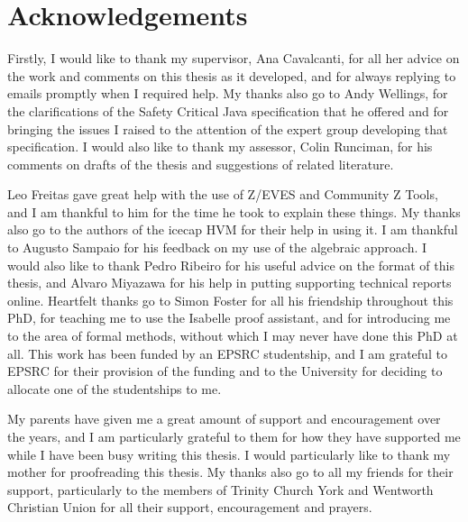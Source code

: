 \documentclass[a4paper,11pt,twoside,openright]{report}
\begin{document}
\cleardoublepage
{}
{}
\tableofcontents

\cleardoublepage
{}
{}
\listoftables

\cleardoublepage
{}
{}
\listoffigures

\cleardoublepage
{}
{}
\chapter*{Acknowledgements}

Firstly, I would like to thank my supervisor, Ana Cavalcanti, for all
her advice on the work and comments on this thesis as it developed,
and for always replying to emails promptly when I required help.
My thanks also go to Andy Wellings, for the clarifications of the
Safety Critical Java specification that he offered and for bringing
the issues I raised to the attention of the expert group developing
that specification.
I would also like to thank my assessor, Colin Runciman, for his
comments on drafts of the thesis and suggestions of related
literature.

Leo Freitas gave great help with the use of Z/EVES and Community Z
Tools, and I am thankful to him for the time he took to explain these
things.
My thanks also go to the authors of the icecap HVM for their help in
using it.
I am thankful to Augusto Sampaio for his feedback on my use of
the algebraic approach.
I would also like to thank Pedro Ribeiro for his useful advice on the
format of this thesis, and Alvaro Miyazawa for his help in putting
supporting technical reports online.
Heartfelt thanks go to Simon Foster for all his friendship throughout
this PhD, for teaching me to use the Isabelle proof assistant, and for
introducing me to the area of formal methods, without which I may
never have done this PhD at all.
This work has been funded by an EPSRC studentship, and I am grateful to
EPSRC for their provision of the funding and to the University for
deciding to allocate one of the studentships to me.

My parents have given me a great amount of support and encouragement
over the years, and I am particularly grateful to them for how they
have supported me while I have been busy writing this thesis. 
I would particularly like to thank my mother for proofreading this
thesis.
My thanks also go to all my friends for their support, particularly to
the members of Trinity Church York and Wentworth Christian Union for
all their support, encouragement and prayers.
\end{document}
